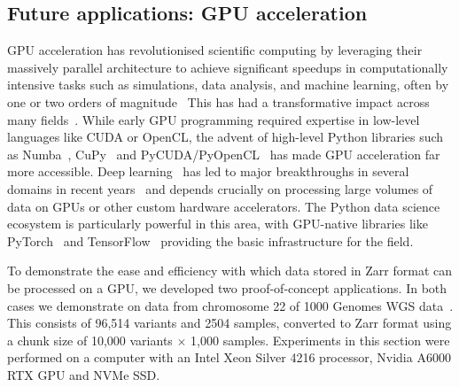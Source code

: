 \documentclass[a4paper,num-refs]{oup-contemporary}
\begin{document}
\subsection{Future applications: GPU acceleration}
GPU acceleration has revolutionised scientific computing by leveraging 
their massively parallel architecture to achieve significant speedups in
computationally intensive tasks such as simulations, data analysis, and machine
learning, often by one or two orders of magnitude~\citep{nickolls2010gpu,
mittal2014survey,owens2008gpu}
This has had a transformative impact across many 
fields~\citep[e.g.][]{stone2007accelerating,pandey2022transformational}.
While early GPU programming required expertise in
low-level languages like CUDA or OpenCL, the advent of high-level Python
libraries such as Numba~\citep{lam2015numba}, CuPy~\citep{okuta2017cupy} 
and PyCUDA/PyOpenCL~\citep{klockner2012pycuda}
has made GPU acceleration far more accessible.
Deep learning~\citep{lecun2015deep} has led to major breakthroughs in 
several domains in recent 
years~\citep[e.g.][]{jumper2021highly,merchant2023scaling}
and depends crucially on processing large volumes of data
on GPUs or other custom hardware accelerators.
The Python data science ecosystem is particularly powerful in this area,
with GPU-native libraries like
PyTorch~\cite{paszke2019pytorch}
and TensorFlow~\citep{tensorflow2015-whitepaper}
providing the basic infrastructure for the field.

To demonstrate the ease and efficiency with which data stored in Zarr
format can be processed on a GPU, we developed two proof-of-concept
applications. 
In both cases we demonstrate on data from chromosome 22 of
1000 Genomes WGS data~\citep{byrska2022high}. This consists
of 96,514 variants and 2504 samples, converted to Zarr format
using a chunk size of 10,000 variants $\times$ 1,000 samples.
Experiments in this section were performed on a
computer with an Intel Xeon Silver 4216 processor,
Nvidia A6000 RTX GPU and NVMe SSD.
\end{document}
